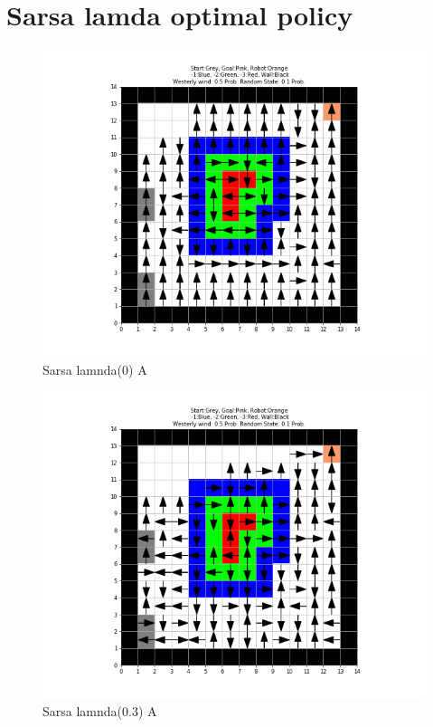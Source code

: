 \documentclass[12pt, letterpaper, twoside]{report}
\begin{document}
\section*{Sarsa lamda optimal policy}

  \centering
  \begin{figure}[b]
    \includegraphics[width=\linewidth]{Sarsa_Problem_A_lambda_0.png}
    \caption{Sarsa lamnda(0) A }
  \end{figure}
  \centering
  \begin{figure}[b]
    \includegraphics[width=\linewidth]{Sarsa_Problem_A_lambda_03.png}
    \caption{Sarsa lamnda(0.3) A}
  \end{figure}
\end{document}
